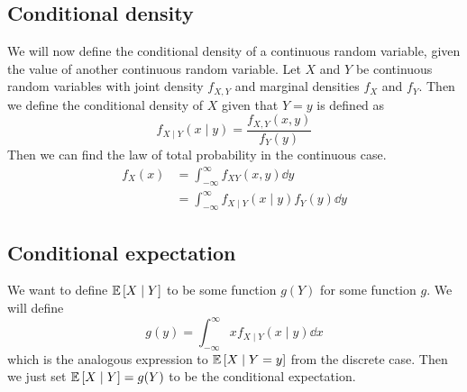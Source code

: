 \subsection{Conditional density}
We will now define the conditional density of a continuous random variable, given the value of another continuous random variable.
Let \(X\) and \(Y\) be continuous random variables with joint density \(f_{X, Y}\) and marginal densities \(f_X\) and \(f_Y\).
Then we define the conditional density of \(X\) given that \(Y = y\) is defined as
\[
	f_{X \mid Y}(x \mid y) = \frac{f_{X, Y}(x, y)}{f_Y(y)}
\]
Then we can find the law of total probability in the continuous case.
\begin{align*}
	f_X(x) & = \int_{-\infty}^\infty f_{XY}(x, y) \dd{y}                 \\
	       & = \int_{-\infty}^\infty f_{X \mid Y}(x \mid y)f_Y(y) \dd{y}
\end{align*}

\subsection{Conditional expectation}
We want to define \(\mathbb{E}\left[{X \mid Y}\right]\) to be some function \(g(Y)\) for some function \(g\).
We will define
\[
	g(y) = \int_{-\infty}^\infty xf_{X \mid Y}(x \mid y) \dd{x}
\]
which is the analogous expression to \(\mathbb{E}\left[{X \mid Y = y}\right]\) from the discrete case.
Then we just set \(\mathbb{E}\left[{X \mid Y}\right] = g(Y)\) to be the conditional expectation.

